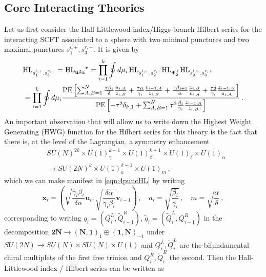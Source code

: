 \documentclass[main.tex]{subfiles}
\begin{document}
\subsection{Core Interacting Theories}\label{sec:coreint}
Let us first consider the Hall-Littlewood index/Higgs-branch Hilbert series for the interacting SCFT associated to a sphere with two minimal punctures and two maximal punctures $s_1^{l,+},s_{3}^{r,+}$. It is given by
\begin{equation}
\begin{aligned}
&\HL_{s^{l,+}_1,s^{r,+}_{3}}=\HL\indices{_{\mathbf{u}\delta\alpha}^{\mathbf{v}}}=\prod_{i=1}^k \oint d\mu_i\,\HL_{s^{l,+}_1,s^{r,+}_{2}}\HL_{\Phi_{2}^+}\HL_{s^{l,+}_{2},s^{r,+}_{3}}\\
&=\prod_{i=1}^k\oint d\mu_i\frac{\PE\left[\sum_{A,B=1}^N\frac{\tau\beta_{i}}{\delta}\frac{u_{i,A}}{z_{i,B}}+\frac{\tau\alpha}{\gamma_i}\frac{v_{i-1,A}}{z_{i,B}}+\frac{\tau\beta_{i+1}}{\alpha}\frac{z_{i,B}}{v_{i,A}}+\frac{\tau\delta}{\gamma_i}\frac{z_{i-1,B}}{u_{i,A}}\right]}{\PE\left[-\tau^2\delta_{k,1}+\sum_{A,B=1}^N\tau^2\frac{\beta_{i}}{\gamma_i}\frac{z_{i-1,A}}{z_{i,B}}\right]}\label{eqn:4puncHL}\,.
\end{aligned}
\end{equation}
An important observation that will allow us to write down the Highest Weight Generating (HWG) function \cite{Hanany:2014dia} for the Hilbert series for this theory is the fact that there is, at the level of the Lagrangian, a symmetry enhancement 
\begin{equation}\label{eqn:4punsymenhance}
\begin{aligned}
&SU(N)^{2k}\times U(1)_{\gamma}^{k-1}\times U(1)_{\beta}^{k-1}\times U(1)_{\delta}\times U(1)_{\alpha}\\
&\to SU(2N)^{k}\times U(1)_{a}^{k-1} \times U(1)_{m}\,,
\end{aligned}
\end{equation}
which we can make manifest in \eqref{eqn:4puncHL} by writing
\begin{equation}
\mathbf{x}_i=\left(\sqrt{\frac{\gamma_i\beta_i}{\delta\alpha}}\mathbf{u}_i,\sqrt{\frac{\delta\alpha}{\gamma_i\beta_i}}\mathbf{v}_{i-1}\right)\,,\quad a_i=\sqrt{\frac{\beta_i}{\gamma_i}}\,,\quad m=\sqrt{\frac{\alpha}{\delta}}\,,
\end{equation}
corresponding to writing $q_i=(Q_i^L,\widetilde{Q}_{i-1}^R)$, $\widetilde{q}_i=(\widetilde{Q}_i^L,Q^R_{i-1})$ in the decomposition $\mathbf{2N}\to(\mathbf{N},\mathbf{1})_1\oplus(\mathbf{1},\mathbf{N})_{-1}$ under $SU(2N)\to SU(N)\times SU(N)\times U(1)$ and $Q_i^L,\widetilde{Q}_{i}^L$ are the bifundamental chiral multiplets of the first free trinion and $Q_i^R,\widetilde{Q}_{i}^R$ the second. Then the Hall-Littlewood index / Hilbert series can be written as
\end{document}
